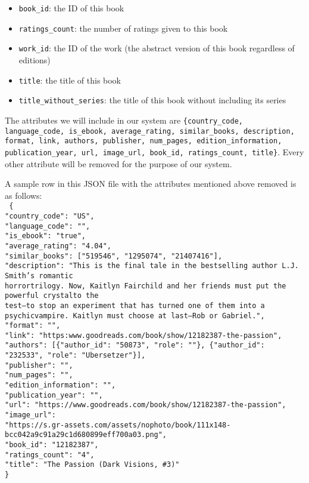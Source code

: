 \documentclass[fontsize=11pt]{article}
\begin{document}
\begin{itemize}
\begin{enumerate}
\begin{itemize}
\item \texttt{book\_id}: the ID of this book
\item \texttt{ratings\_count}: the number of ratings given to this book
\item \texttt{work\_id}: the ID of the work (the abstract version of this book regardless of editions)
\item \texttt{title}: the title of this book
\item \texttt{title\_without\_series}: the title of this book without including its series
\end{itemize}
 
The attributes we will include in our system are \texttt{\{country\_code, language\_code, is\_ebook, average\_rating, similar\_books, description, format, link, authors, publisher, num\_pages, edition\_information, publication\_year, url, image\_url, book\_id, ratings\_count, title\}}. Every other attribute will be removed for the purpose of our system.
 
A sample row in this JSON file with the attributes mentioned above removed is as follows:\\
\texttt{
\{ \\
"country\_code": "US",\\
"language\_code": "",\\
"is\_ebook": "true",\\
"average\_rating": "4.04",\\
"similar\_books": ["519546", "1295074", "21407416"],\\
"description": "This is the final tale in the bestselling author L.J. Smith's romantic \\horrortrilogy. Now, Kaitlyn Fairchild and her friends must put the powerful crystalto the \\
test--to stop an experiment that has turned one of them into a psychicvampire. Kaitlyn must choose at last--Rob or Gabriel.",\\
"format": "",\\
"link": "https:\text{//}www.goodreads.com/book/show/12182387-the-passion",\\
"authors": 
[\{"author\_id": "50873", "role": ""\}, \{"author\_id": "232533", "role": "Ubersetzer"\}],\\
"publisher": "",\\
"num\_pages": "",\\
"edition\_information": "",\\
"publication\_year": "",\\
"url": "https://www.goodreads.com/book/show/12182387-the-passion",\\
"image\_url": \\
"https://s.gr-assets.com/assets/nophoto/book/111x148-bcc042a9c91a29c1d680899eff700a03.png",\\
"book\_id": "12182387",\\
"ratings\_count": "4",\\
"title": "The Passion (Dark Visions, \#3)" \\
\}
} \\


\end{enumerate}
\end{itemize}
\end{document}
